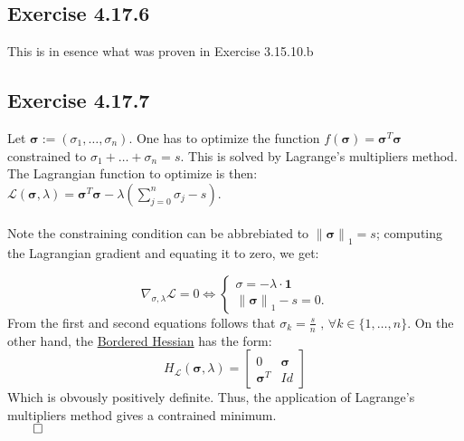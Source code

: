 \documentclass{exam}
\renewenvironment{proof}{{\noindent\itshape\ignorespaces}}{{\hfill$\qed$\\}}
\begin{document}
\subsection*{Exercise 4.17.6}
This is in esence what was proven in Exercise 3.15.10.b  

\subsection*{Exercise 4.17.7}
Let $\boldsymbol{\sigma} := (\sigma_1, \ldots, \sigma_n)$. One has to optimize the function $\displaystyle f(\boldsymbol{\sigma}) = \boldsymbol{\sigma}^{T}\boldsymbol{\sigma}$ constrained to $\sigma_{1} + \ldots + \sigma_{n} = s$. This is solved by Lagrange's multipliers method. The Lagrangian function 
to optimize is then:\\
\begin{proof}
    $\displaystyle \mathcal{L}(\boldsymbol{\sigma}, \lambda) = \boldsymbol{\sigma}^{T}\boldsymbol{\sigma} - \lambda (\sum_{j=0}^{n}\sigma_{j} - s)$.\\
\\
Note the constraining condition can be abbrebiated to ${\lVert \boldsymbol{\sigma} \lVert}_{1} = s$; computing the Lagrangian gradient and equating it to zero, we get:

\begin{equation*}
    {\nabla}_{\sigma, \lambda} \mathcal{L} = 0 
    \Longleftrightarrow \begin{cases}
        \sigma = -\lambda \cdot \boldsymbol{1} \\
        {\lVert \boldsymbol{\sigma} \lVert}_{1} - s = 0.
    \end{cases}
\end{equation*}
\noindent From the first and second equations follows that $\sigma_k  = \frac{s}{n} \text{ , } \forall k \in \{ 1, \ldots ,n \}$. On the other hand, the \href{https://en.wikipedia.org/wiki/Hessian_matrix}{Bordered Hessian} has the form: \\
\begin{equation*}
    H_{\mathcal{L}}(\boldsymbol{\sigma}, \lambda) =  \begin{bmatrix}
        0 & \boldsymbol{\sigma}\\
        \boldsymbol{\sigma}^{T} & Id 
    \end{bmatrix}
\end{equation*}    
Which is obvously positively definite. Thus, the application of Lagrange's multipliers method gives a contrained minimum. \\
\end{proof}
\end{document}
